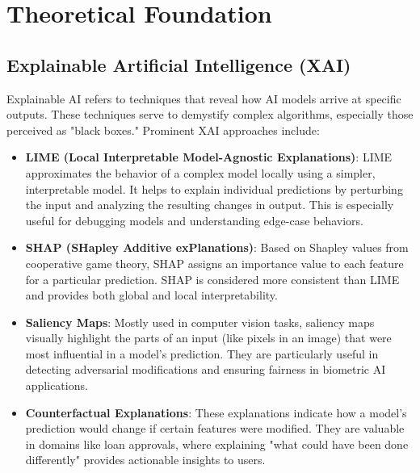 \documentclass[12pt]{article}
\begin{document}
\section{Theoretical Foundation}

\subsection{Explainable Artificial Intelligence (XAI)}
Explainable AI refers to techniques that reveal how AI models arrive at specific outputs. These techniques serve to demystify complex algorithms, especially those perceived as "black boxes." Prominent XAI approaches include:

\begin{itemize}[noitemsep]
  \item \textbf{LIME (Local Interpretable Model-Agnostic Explanations)}: LIME approximates the behavior of a complex model locally using a simpler, interpretable model. It helps to explain individual predictions by perturbing the input and analyzing the resulting changes in output. This is especially useful for debugging models and understanding edge-case behaviors.

  \item \textbf{SHAP (SHapley Additive exPlanations)}: Based on Shapley values from cooperative game theory, SHAP assigns an importance value to each feature for a particular prediction. SHAP is considered more consistent than LIME and provides both global and local interpretability.

  \item \textbf{Saliency Maps}: Mostly used in computer vision tasks, saliency maps visually highlight the parts of an input (like pixels in an image) that were most influential in a model's prediction. They are particularly useful in detecting adversarial modifications and ensuring fairness in biometric AI applications.

  \item \textbf{Counterfactual Explanations}: These explanations indicate how a model's prediction would change if certain features were modified. They are valuable in domains like loan approvals, where explaining "what could have been done differently" provides actionable insights to users.
\end{itemize}

\titleformat{\section}{\large\bfseries}{\thesection}{1em}{}
\titleformat{\subsection}{\normalsize\bfseries}{\thesubsection}{1em}{}
\end{document}
